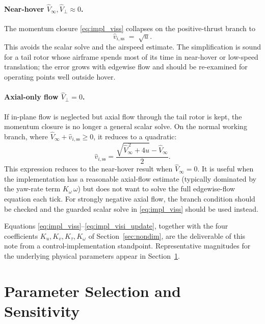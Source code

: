 \documentclass[11pt,a4paper]{article}
\let\oldsection\section
\renewcommand{\section}{\clearpage\oldsection}
\begin{document}
\paragraph{Near-hover \(\hat V_\infty, \hat V_\perp \approx 0\).}
The momentum closure \eqref{eq:impl_viss} collapses on the
positive-thrust branch to
\begin{equation}
\hat v_{i,\text{ss}} \;=\; \sqrt{u}.
\end{equation}
This avoids the scalar solve and the airspeed estimate. The
simplification is sound for a tail rotor whose airframe spends most of
its time in near-hover or low-speed translation; the error grows with
edgewise flow and should be re-examined for operating points well
outside hover.

\paragraph{Axial-only flow \(\hat V_\perp = 0\).}
If in-plane flow is neglected but axial flow through the tail rotor is
kept, the momentum closure is no longer a general scalar solve. On the
normal working branch, where \(\hat V_\infty + \hat v_{i,\text{ss}}\ge 0\),
it reduces to a quadratic:
\begin{equation}
\hat v_{i,\text{ss}}
= \frac{\sqrt{\hat V_\infty^{\,2} + 4u} - \hat V_\infty}{2}.
\label{eq:impl_viss_axial}
\end{equation}
This expression reduces to the near-hover result when
\(\hat V_\infty=0\). It is useful when the implementation has a
reasonable axial-flow estimate (typically dominated by the yaw-rate
term \(K_\omega\,\omega\)) but does not want to solve the full edgewise-flow
equation each tick. For strongly negative axial flow, the branch
condition should be checked and the guarded scalar solve in
\eqref{eq:impl_viss} should be used instead.

\medskip
\noindent
Equations \eqref{eq:impl_viss}--\eqref{eq:impl_visi_update}, together
with the four coefficients \(K_u, K_v, K_\tau, K_\omega\) of Section~\ref{sec:nondim},
are the deliverable of this note from a control-implementation
standpoint. Representative magnitudes for the underlying physical
parameters appear in Section~\ref{sec:params}.

\section{Parameter Selection and Sensitivity}\label{sec:params}
\end{document}
